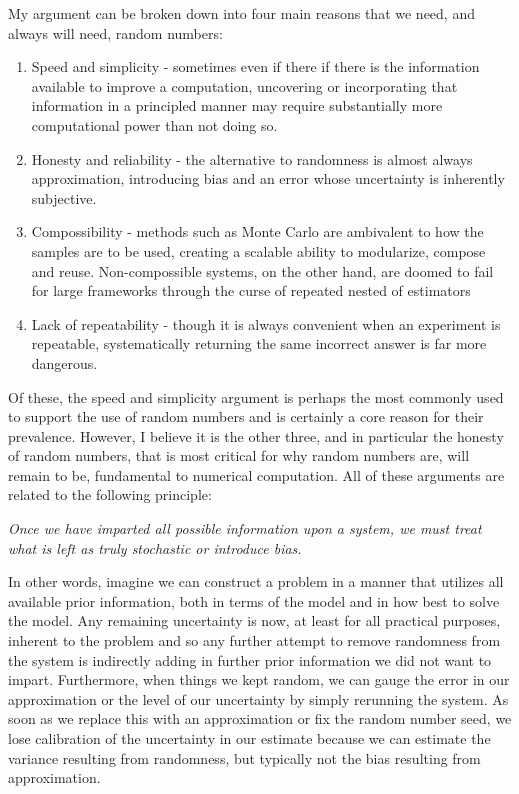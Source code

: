 My argument can be broken down into four main reasons that we need, and always will need, random numbers:
\begin{enumerate}
	\item Speed and simplicity - sometimes even if there if there is the information available to improve a computation, 
	uncovering or incorporating that information in a principled manner may require substantially more computational 
	power than not doing so.
	\item Honesty and reliability - the alternative to randomness is almost always approximation, introducing bias 
	and an error whose uncertainty is inherently subjective.
	\item Compossibility - methods such as Monte Carlo are ambivalent to how the samples are to be used, creating 
	a scalable ability to modularize, compose and reuse.  Non-compossible systems, on the other hand, are doomed to fail
	for large frameworks through the curse of repeated nested of estimators~\citep{rainforth2016pitfalls}
	\item Lack of repeatability - though it is always convenient when an experiment is repeatable, systematically 
	returning the same incorrect answer is far more dangerous.
\end{enumerate}
Of these, the speed and simplicity argument is perhaps the most commonly used to support the use of random 
numbers and is certainly a core reason for their prevalence.  However, I believe it is the other three, and in 
particular the honesty of random numbers, that is most critical for why random numbers are, will remain to be, 
fundamental to numerical computation.  All of these arguments are related to the following principle:

\emph{Once we have imparted all possible information upon a system, we must treat what is left as truly 
	stochastic or introduce bias.}

In other words, imagine we can construct a problem in a manner that utilizes all available prior information,
both in terms of the model and in how best to solve the model.
Any remaining uncertainty is now, at least for all practical purposes, inherent to the problem and so any
further attempt to remove randomness from the system is indirectly adding in further prior information we
did not want to impart.  Furthermore, when things we kept random, we can gauge the error in our approximation
or the level of our uncertainty by simply rerunning the system.  As soon as we replace this with an approximation
or fix the random number seed, we lose calibration of the uncertainty in our estimate because we can estimate the variance
resulting from randomness, but typically not the bias resulting from approximation.


